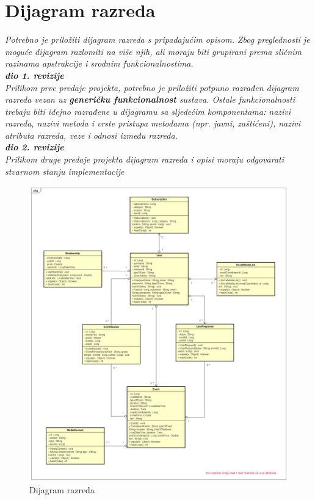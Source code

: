 			
		\section{Dijagram razreda}
		
			\textit{Potrebno je priložiti dijagram razreda s pripadajućim opisom. Zbog preglednosti je moguće dijagram razlomiti na više njih, ali moraju biti grupirani prema sličnim razinama apstrakcije i srodnim funkcionalnostima.}\\
			
			\textbf{\textit{dio 1. revizije}}\\
			
			\textit{Prilikom prve predaje projekta, potrebno je priložiti potpuno razrađen dijagram razreda vezan uz \textbf{generičku funkcionalnost} sustava. Ostale funkcionalnosti trebaju biti idejno razrađene u dijagramu sa sljedećim komponentama: nazivi razreda, nazivi metoda i vrste pristupa metodama (npr. javni, zaštićeni), nazivi atributa razreda, veze i odnosi između razreda.}\\
			
			\textbf{\textit{dio 2. revizije}}\\			
			
			\textit{Prilikom druge predaje projekta dijagram razreda i opisi moraju odgovarati stvarnom stanju implementacije}
			
			\begin{figure}[H]
				\includegraphics[width=\textwidth]{dijagrami/cd1.png} 
				\centering
				\caption{Dijagram razreda}
				\label{fig:promjene}
			\end{figure}
			
